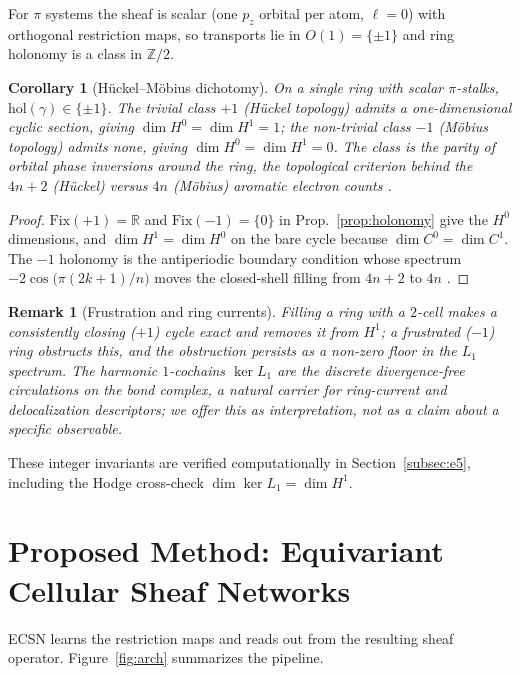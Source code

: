 \documentclass[pdflatex,sn-mathphys-num]{sn-jnl}%
\newcommand{\R}{\mathbb{R}}
\theoremstyle{thmstyleone}
\newtheorem{corollary}[theorem]{Corollary}
\theoremstyle{thmstyletwo}
\newtheorem{remark}[theorem]{Remark}
\theoremstyle{thmstylethree}
\begin{document}
For $\pi$ systems the sheaf is scalar (one $p_z$ orbital per atom, $\ell=0$) with
orthogonal restriction maps, so transports lie in $O(1)=\{\pm1\}$ and ring
holonomy is a class in $\mathbb{Z}/2$.

\begin{corollary}[H\"uckel--M\"obius dichotomy]\label{cor:mobius}
On a single ring with scalar $\pi$-stalks, $\mathrm{hol}(\gamma)\in\{\pm1\}$. The
trivial class $+1$ (\emph{H\"uckel} topology) admits a one-dimensional cyclic
section, giving $\dim H^0=\dim H^1=1$; the non-trivial class $-1$
(\emph{M\"obius} topology) admits none, giving $\dim H^0=\dim H^1=0$. The class is
the parity of orbital phase inversions around the ring, the topological criterion
behind the $4n{+}2$ (H\"uckel) versus $4n$ (M\"obius) aromatic electron counts
\cite{heilbronner1964}.
\end{corollary}
\begin{proof}
$\mathrm{Fix}(+1)=\R$ and $\mathrm{Fix}(-1)=\{0\}$ in Prop.~\ref{prop:holonomy}
give the $H^0$ dimensions, and $\dim H^1=\dim H^0$ on the bare cycle because
$\dim C^0=\dim C^1$. The $-1$ holonomy is the antiperiodic boundary condition
whose spectrum $-2\cos\!\big(\pi(2k{+}1)/n\big)$ moves the closed-shell filling
from $4n{+}2$ to $4n$ \cite{heilbronner1964}.
\end{proof}

\begin{remark}[Frustration and ring currents]
Filling a ring with a $2$-cell makes a consistently closing ($+1$) cycle exact
and removes it from $H^1$; a frustrated ($-1$) ring obstructs this, and the
obstruction persists as a non-zero floor in the $L_1$ spectrum. The harmonic
$1$-cochains $\ker L_1$ are the discrete divergence-free circulations on the bond
complex, a natural carrier for ring-current and delocalization descriptors; we
offer this as interpretation, not as a claim about a specific observable.
\end{remark}

These integer invariants are verified computationally in
Section~\ref{subsec:e5}, including the Hodge cross-check $\dim\ker L_1=\dim H^1$.

\section{Proposed Method: Equivariant Cellular Sheaf Networks}\label{sec:method}

ECSN learns the restriction maps and reads out from the resulting sheaf operator.
Figure~\ref{fig:arch} summarizes the pipeline.
\end{document}
